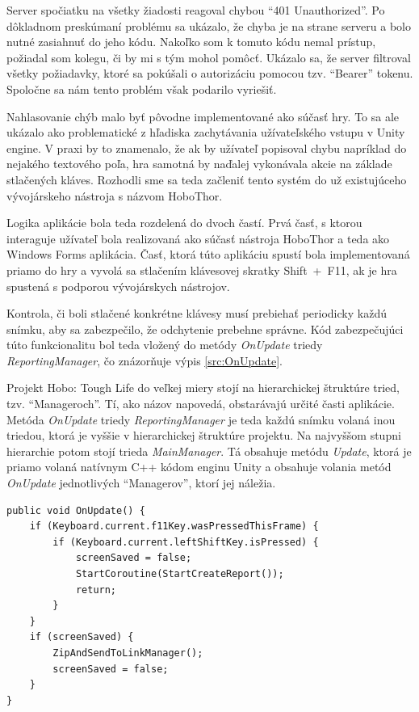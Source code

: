 \documentclass[slovak, bachelorpractice]{diploma}
\begin{document}
Server spočiatku na všetky žiadosti reagoval chybou \enquote{401 Unauthorized}. Po dôkladnom preskúmaní problému sa ukázalo, že chyba je na strane serveru a bolo nutné zasiahnuť do jeho kódu. Nakoľko som k tomuto kódu nemal prístup, požiadal som kolegu, či by mi s tým mohol pomôcť. Ukázalo sa, že server filtroval všetky požiadavky, ktoré sa pokúšali o autorizáciu pomocou tzv. \enquote{Bearer} tokenu. Spoločne sa nám tento problém však podarilo vyriešiť. 

Nahlasovanie chýb malo byť pôvodne implementované ako súčasť hry. To sa ale ukázalo ako problematické z hľadiska zachytávania užívateľského vstupu v Unity engine. V praxi by to znamenalo, že ak by užívateľ popisoval chybu napríklad do nejakého textového poľa, hra samotná by naďalej vykonávala akcie na základe stlačených kláves. Rozhodli sme sa teda začleniť tento systém do už existujúceho vývojárskeho nástroja s názvom HoboThor.

Logika aplikácie bola teda rozdelená do dvoch častí. Prvá časť, s ktorou interaguje užívateľ bola realizovaná ako súčasť nástroja HoboThor a teda ako Windows Forms aplikácia. Časť, ktorá túto aplikáciu spustí bola implementovaná priamo do hry a vyvolá sa stlačením klávesovej skratky \mbox{Shift + F11}, ak je hra spustená s podporou vývojárskych nástrojov. 

Kontrola, či boli stlačené konkrétne klávesy musí prebiehať periodicky každú snímku, aby sa zabezpečilo, že odchytenie prebehne správne. Kód zabezpečujúci túto funkcionalitu bol teda vložený do metódy \textit{OnUpdate} triedy \textit{ReportingManager}, čo znázorňuje výpis \ref{src:OnUpdate}. 

Projekt Hobo: Tough Life do veľkej miery stojí na hierarchickej štruktúre tried, tzv. \enquote{Manageroch}. Tí, ako názov napovedá, obstarávajú určité časti aplikácie. Metóda \textit{OnUpdate} triedy \textit{ReportingManager} je teda každú snímku volaná inou triedou, ktorá je vyššie v hierarchickej štruktúre projektu. Na najvyššom stupni hierarchie potom stojí trieda \textit{MainManager}. Tá obsahuje metódu \textit{Update}, ktorá je priamo volaná natívnym C++ kódom enginu Unity a obsahuje volania metód \textit{OnUpdate} jednotlivých \enquote{Managerov}, ktorí jej náležia.
\vspace{8pt}
\begin{lstlisting}[label=src:OnUpdate,caption={Odchytenie stlačenia klávesovej skratky v spustenej hre}]
public void OnUpdate() {
    if (Keyboard.current.f11Key.wasPressedThisFrame) {
        if (Keyboard.current.leftShiftKey.isPressed) {
            screenSaved = false;
            StartCoroutine(StartCreateReport());
            return;
        }
    }
    if (screenSaved) {
        ZipAndSendToLinkManager();
        screenSaved = false;
    }
}
\end{lstlisting}
\end{document}
